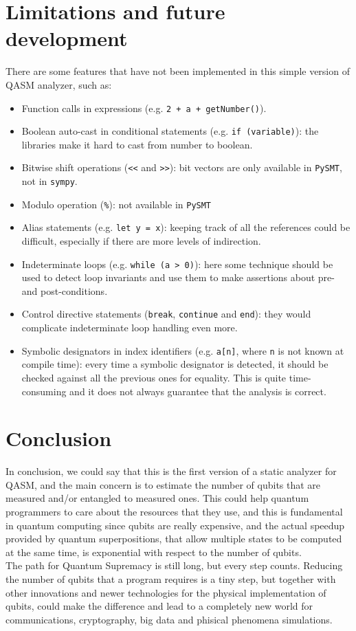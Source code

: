 \documentclass[12pt,a4paper]{report}
\theoremstyle{definition}
\theoremstyle{definition}
\theoremstyle{definition}
\begin{document}
\section{Limitations and future development}
There are some features that have not been implemented in this simple version of QASM analyzer, such as:
\begin{itemize}
    \itemsep 0em
    \item Function calls in expressions (e.g. \texttt{2 + a + getNumber()}).
    \item Boolean auto-cast in conditional statements (e.g. \texttt{if (variable)}): the libraries make it hard to cast from number to boolean.
    \item Bitwise shift operations (\texttt{<<} and \texttt{>>}): bit vectors are only available in \texttt{PySMT}, not in \texttt{sympy}.
    \item Modulo operation (\texttt{\%}): not available in \texttt{PySMT}
    \item Alias statements (e.g. \texttt{let y = x}): keeping track of all the references could be difficult, especially if there are more levels of indirection.
    \item Indeterminate loops (e.g. \texttt{while (a > 0)}): here some technique should be used to detect loop invariants and use them to make assertions about pre- and post-conditions.
    \item Control directive statements (\texttt{break}, \texttt{continue} and \texttt{end}): they would complicate indeterminate loop handling even more.
    \item Symbolic designators in index identifiers (e.g. \texttt{a[n]}, where \texttt{n} is not known at compile time): every time a symbolic designator is detected, it should be checked against all the previous ones for equality. This is quite time-consuming and it does not always guarantee that the analysis is correct.
\end{itemize}


\section{Conclusion}
In conclusion, we could say that this is the first version of a static analyzer for QASM, and the main concern is to estimate the number of qubits that are measured and/or entangled to measured ones. This could help quantum programmers to care about the resources that they use, and this is fundamental in quantum computing since qubits are really expensive, and the actual speedup provided by quantum superpositions, that allow multiple states to be computed at the same time, is exponential with respect to the number of qubits.\\
The path for Quantum Supremacy is still long, but every step counts. Reducing the number of qubits that a program requires is a tiny step, but together with other innovations and newer technologies for the physical implementation of qubits, could make the difference and lead to a completely new world for communications, cryptography, big data and phisical phenomena simulations.

\printbibliography
\end{document}
